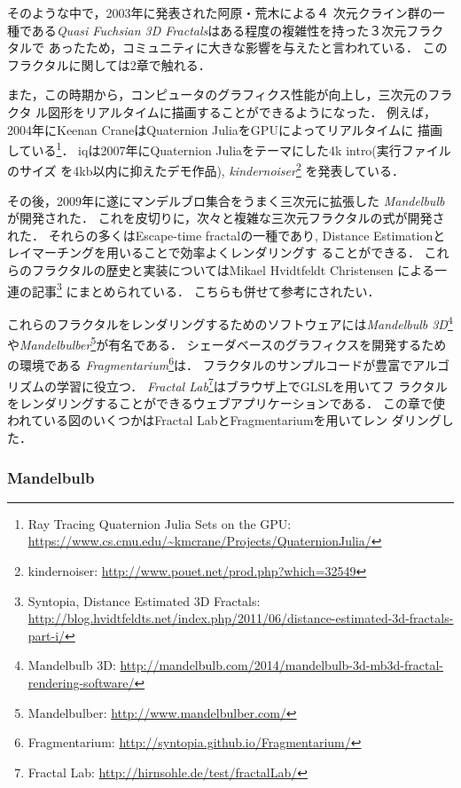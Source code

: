 そのような中で，2003年に発表された阿原・荒木による４
次元クライン群の一種である\textit{Quasi Fuchsian 3D
Fractals}\cite{ahara2003sphairahedral}はある程度の複雑性を持った３次元フラクタルで
あったため，コミュニティに大きな影響を与えたと言われている．
このフラクタルに関しては2章で触れる．

また，この時期から，コンピュータのグラフィクス性能が向上し，三次元のフラクタ
ル図形をリアルタイムに描画することができるようになった．
例えば，2004年にKeenan CraneはQuaternion JuliaをGPUによってリアルタイムに
描画している\footnote{Ray Tracing Quaternion Julia Sets on
the GPU:
\url{https://www.cs.cmu.edu/~kmcrane/Projects/QuaternionJulia/}}．
iqは2007年にQuaternion Juliaをテーマにした4k intro(実行ファイルのサイズ
を4kb以内に抑えたデモ作品),
\textit{kindernoiser}\footnote{kindernoiser: \url{http://www.pouet.net/prod.php?which=32549}}
を発表している．

その後，2009年に遂にマンデルブロ集合をうまく三次元に拡張した
\textit{Mandelbulb}が開発された．
これを皮切りに，次々と複雑な三次元フラクタルの式が開発された．
それらの多くはEscape-time fractalの一種であり,
Distance Estimationとレイマーチングを用いることで効率よくレンダリングす
ることができる．
これらのフラクタルの歴史と実装についてはMikael Hvidtfeldt Christensen
による一連の記事\footnote{Syntopia, Distance Estimated 3D
Fractals:\\ \quad \quad
\url{http://blog.hvidtfeldts.net/index.php/2011/06/distance-estimated-3d-fractals-part-i/}}
にまとめられている．
こちらも併せて参考にされたい．

これらのフラクタルをレンダリングするためのソフトウェアには\textit{Mandelbulb
3D}\footnote{Mandelbulb 3D:
\url{http://mandelbulb.com/2014/mandelbulb-3d-mb3d-fractal-rendering-software/}}
や\textit{Mandelbulber}\footnote{Mandelbulber:
\url{http://www.mandelbulber.com/}}が有名である．
シェーダベースのグラフィクスを開発するための環境である
\textit{Fragmentarium}\footnote{Fragmentarium:
\url{http://syntopia.github.io/Fragmentarium/}}は．
フラクタルのサンプルコードが豊富でアルゴリズムの学習に役立つ．
\textit{Fractal Lab}\footnote{Fractal Lab:
\url{http://hirnsohle.de/test/fractalLab/}}はブラウザ上でGLSLを用いてフ
ラクタルをレンダリングすることができるウェブアプリケーションである．
この章で使われている図のいくつかはFractal LabとFragmentariumを用いてレン
ダリングした．

\subsubsection{Mandelbulb}

